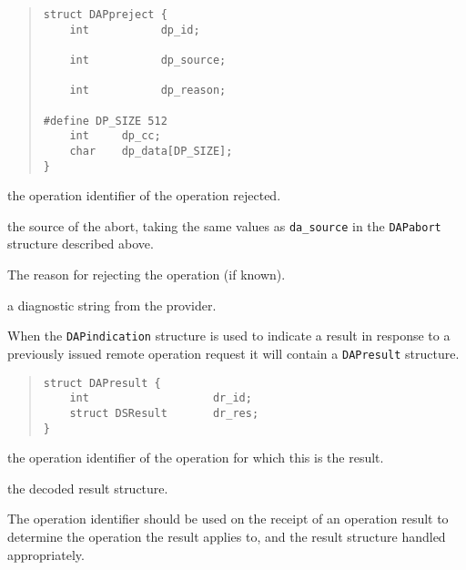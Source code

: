 \label{DAPpreject}
\begin{quote}\small\begin{verbatim}
struct DAPpreject {
    int           dp_id;

    int           dp_source;

    int           dp_reason;

#define DP_SIZE 512
    int     dp_cc;
    char    dp_data[DP_SIZE];
}
\end{verbatim}\end{quote}

\begin{describe}
\item [\verb"dp\_id":]
the operation identifier of the operation rejected.

\item [\verb"dp\_source":]
the source of the abort, taking the same values as \verb"da_source"
in the \verb"DAPabort" structure described above.

\item [\verb"dp\_reason":]
The reason for rejecting the operation (if known). 

\item [\verb"dp\_data"/\verb"dp\_cc":] a diagnostic string from the
provider.
\end{describe}

When the \verb"DAPindication" structure is used to indicate a result
in response to a previously issued remote operation request
it will contain a \verb"DAPresult" structure.

\label{DAPresult}
\begin{quote}\small\begin{verbatim}
struct DAPresult {
    int                   dr_id;
    struct DSResult       dr_res;
}
\end{verbatim}\end{quote}

\begin{describe}
\item [\verb"dr\_id":]
the operation identifier of the operation for which this is the result.

\item [\verb"dr\_res":]
the decoded result structure.
\end{describe}

The operation identifier should be used on the receipt of an operation
result to determine the operation the result applies to, and the
result structure handled appropriately.

